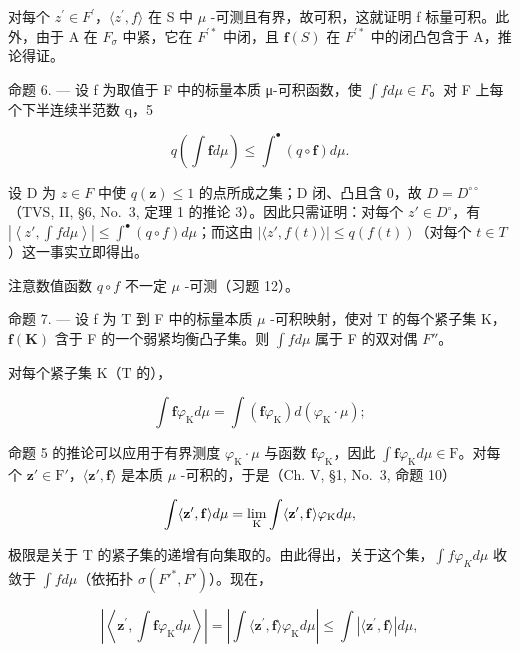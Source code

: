 对每个 \(z^{\prime} \in F^{\prime}\)，\(\langle z^{\prime}, f \rangle\) 在 S 中 \(\mu\) -可测且有界，故可积，这就证明 f 标量可积。此外，由于 A 在 \(F_{\sigma}\) 中紧，它在 \(F^{\prime*}\) 中闭，且 \(\mathbf{f}(S)\) 在 \(F^{\prime*}\) 中的闭凸包含于 A，推论得证。

命题 6. --- 设 f 为取值于 F 中的标量本质 μ-可积函数，使 \(\int f d\mu \in F\)。对 F 上每个下半连续半范数 q，5

\[
q \left(\int \mathbf {f} d \mu\right) \leqslant \int^ {\bullet} (q \circ \mathbf {f}) d \mu .
\]

设 D 为 \(z \in F\) 中使 \(q(\mathbf{z}) \leqslant 1\) 的点所成之集；D 闭、凸且含 0，故 \(D = D^{\circ\circ}\)（TVS, II, §6, No.~3, 定理 1 的推论 3）。因此只需证明：对每个 \(z' \in D^{\circ}\)，有 \(\left|\left\langle z', \int f d\mu \right\rangle\right| \leqslant \int^{\bullet}(q \circ f) d\mu\)；而这由 \(|\langle z', f(t) \rangle| \leqslant q(f(t))\)（对每个 \(t \in T\)）这一事实立即得出。

注意数值函数 \(q \circ f\) 不一定 \(\mu\) -可测（习题 12）。

命题 7. --- 设 f 为 T 到 F 中的标量本质 \(\mu\) -可积映射，使对 T 的每个紧子集 K，\(\mathbf{f}(\mathbf{K})\) 含于 F 的一个弱紧均衡凸子集。则 \(\int f d\mu\) 属于 F 的双对偶 \(F''\)。

对每个紧子集 \(\mathrm{K}\)（\(\mathrm{T}\) 的），

\[
\int \mathbf {f} \varphi_ {\mathrm{K}} d \mu = \int (\mathbf {f} \varphi_ {\mathrm{K}}) d (\varphi_ {\mathrm{K}} \cdot \mu);
\]

命题 5 的推论可以应用于有界测度 \(\varphi_{\mathrm{K}} \cdot \mu\) 与函数 \(\mathbf{f}\varphi_{\mathrm{K}}\)，因此 \(\int \mathbf{f}\varphi_{\mathrm{K}} d\mu \in \mathrm{F}\)。对每个 \(\mathbf{z}' \in \mathrm{F}'\)，\(\langle \mathbf{z}', \mathbf{f} \rangle\) 是本质 \(\mu\) -可积的，于是（Ch. V, §1, No.~3, 命题 10）

\[
\int \langle {\bf z} ^ {\prime}, {\bf f} \rangle d \mu = \lim _ {\mathrm{K}} \int \langle {\bf z} ^ {\prime}, {\bf f} \rangle \varphi_ {\mathrm{K}} d \mu ,
\]

极限是关于 T 的紧子集的递增有向集取的。由此得出，关于这个集，\(\int f\varphi_{K}d\mu\) 收敛于 \(\int f d\mu\)（依拓扑 \(\sigma(F'^{*},F')\)）。现在，

\[
\left| \left\langle \mathbf {z} ^ {\prime}, \int \mathbf {f} \varphi_ {\mathrm{K}} d \mu \right\rangle \right| = \left| \int \langle \mathbf {z} ^ {\prime}, \mathbf {f} \rangle \varphi_ {\mathrm{K}} d \mu \right| \leqslant \int | \langle \mathbf {z} ^ {\prime}, \mathbf {f} \rangle | d \mu ,
\]

